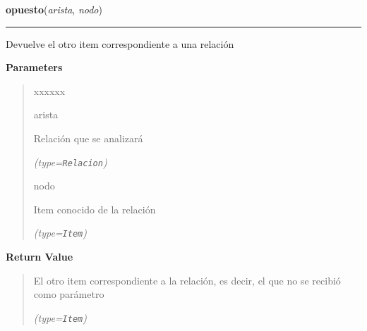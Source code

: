 \hspace{.8\funcindent}\begin{boxedminipage}{\funcwidth}

    \raggedright \textbf{opuesto}(\textit{arista}, \textit{nodo})

    \vspace{-1.5ex}

    \rule{\textwidth}{0.5\fboxrule}
\setlength{\parskip}{2ex}
    Devuelve el otro item correspondiente a una relación

\setlength{\parskip}{1ex}
      \textbf{Parameters}
      \vspace{-1ex}

      \begin{quote}
        \begin{Ventry}{xxxxxx}

          \item[arista]

          Relación que se analizará

            {\it (type=\texttt{Relacion})}

          \item[nodo]

          Item conocido de la relación

            {\it (type=\texttt{Item})}

        \end{Ventry}

      \end{quote}

      \textbf{Return Value}
    \vspace{-1ex}

      \begin{quote}
      El otro item correspondiente a la relación, es decir, el que no se 
      recibió como parámetro

      {\it (type=\texttt{Item})}

      \end{quote}

    \end{boxedminipage}

    \label{saip:lib:func:relaciones_a_actualizadas}

    \vspace{0.5ex}


